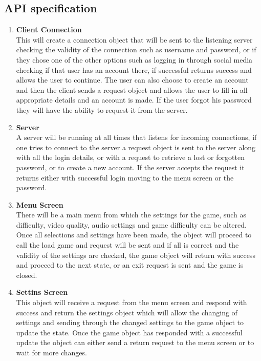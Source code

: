 \documentclass[letterpaper]{article}
\begin{document}
			\subsection*{API specification}
			\vspace{0.1in}
						\begin{enumerate}
			\item \textbf{Client Connection}
			\\This will create a connection object that will be sent to the listening server checking the validity of the connection such as username and password, or if they chose one of the other options such as logging in through social media checking if that user has an account there, if successful returns success and allows the user to continue. The user can also choose to create an account and then the client sends a request object and allows the user to fill in all appropriate details and an account is made. If the user forgot his password they will have the ability to request it from the server.
			\item \textbf{Server}
			\\A server will be running at all times that listens for incoming connections, if one tries to connect to the server a request object is sent to the server along with all the login details, or with a request to retrieve a lost or forgotten password, or to create a new account. If the server accepts the request it returns either with successful login moving to the menu screen or the password.
			\item \textbf{Menu Screen}
			\\There will be a main menu from which the settings for the game, such as difficulty, video quality, audio settings and game difficulty can be altered. Once all selections and settings have been made, the object will proceed to call the load game and request will be sent and if all is correct and the validity of the settings are checked, the game object will return with success and proceed to the next state, or an exit request is sent and the game is closed.
			\item \textbf{Settins Screen}
			\\This object will receive a request from the menu screen and respond with success and return the settings object which will allow the changing of settings and sending through the changed settings to the game object to update the state. Once the game object has responded with a successful update the object can either send a return request to the menu screen or to wait for more changes.

\end{enumerate}
\end{document}
